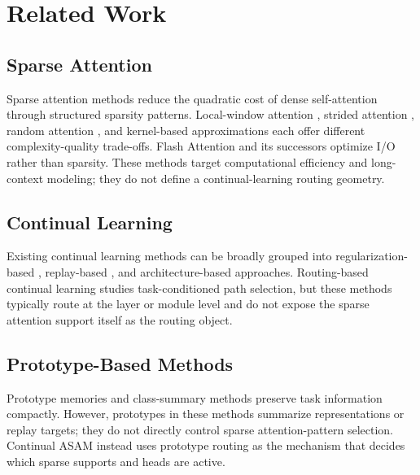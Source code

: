 \documentclass[11pt,a4paper]{article}
\theoremstyle{definition}
\begin{document}
\section{Related Work}
\label{sec:related}

\subsection{Sparse Attention}

Sparse attention methods reduce the quadratic cost of dense self-attention through structured sparsity patterns. Local-window attention \citep{beltagy2020longformer}, strided attention \citep{child2019generating}, random attention \citep{zaheer2020big}, and kernel-based approximations \citep{wang2020linformer,choromanski2020rethinking} each offer different complexity-quality trade-offs. Flash Attention \citep{dao2022flashattention} and its successors optimize I/O rather than sparsity. These methods target computational efficiency and long-context modeling; they do not define a continual-learning routing geometry.

\subsection{Continual Learning}

Existing continual learning methods can be broadly grouped into regularization-based \citep{kirkpatrick2017overcoming,zenke2017continual}, replay-based \citep{rebucci2017icarl,chaudhry2019tiny}, and architecture-based \citep{rusu2016progressive,mallya2018packnet} approaches. Routing-based continual learning \citep{fernando2017pathnet,wen2020batchensemble} studies task-conditioned path selection, but these methods typically route at the layer or module level and do not expose the sparse attention support itself as the routing object.

\subsection{Prototype-Based Methods}

Prototype memories \citep{snell2017prototypical} and class-summary methods \citep{rebuffi2017icarl} preserve task information compactly. However, prototypes in these methods summarize representations or replay targets; they do not directly control sparse attention-pattern selection. Continual ASAM instead uses prototype routing as the mechanism that decides which sparse supports and heads are active.
\end{document}
